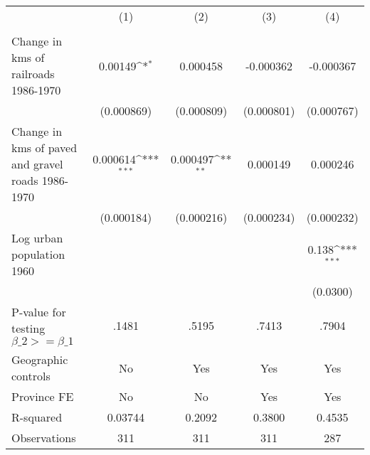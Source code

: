 {
\def\sym#1{\ifmmode^{#1}\else\(^{#1}\)\fi}
\begin{tabular}{l*{4}{c}}
\hline\hline
                &\multicolumn{1}{c}{(1)}&\multicolumn{1}{c}{(2)}&\multicolumn{1}{c}{(3)}&\multicolumn{1}{c}{(4)}\\
                &\multicolumn{1}{c}{}&\multicolumn{1}{c}{}&\multicolumn{1}{c}{}&\multicolumn{1}{c}{}\\
\hline
Change in kms of railroads 1986-1970&  0.00149\sym{*}  & 0.000458         &-0.000362         &-0.000367         \\
                &(0.000869)         &(0.000809)         &(0.000801)         &(0.000767)         \\
[1em]
Change in kms of paved and gravel roads 1986-1970& 0.000614\sym{***}& 0.000497\sym{**} & 0.000149         & 0.000246         \\
                &(0.000184)         &(0.000216)         &(0.000234)         &(0.000232)         \\
[1em]
Log urban population 1960&                  &                  &                  &    0.138\sym{***}\\
                &                  &                  &                  & (0.0300)         \\
\hline
P-value for testing $\beta\_{2} >= \beta\_{1}$&    .1481         &.5195         &.7413        &    .7904         \\
Geographic controls&       No         &      Yes         &      Yes         &      Yes         \\
Province FE     &       No         &       No         &      Yes         &      Yes         \\
R-squared       &  0.03744         &   0.2092         &   0.3800         &   0.4535         \\
Observations    &      311         &      311         &      311         &      287         \\
\hline\hline
\end{tabular}
}
